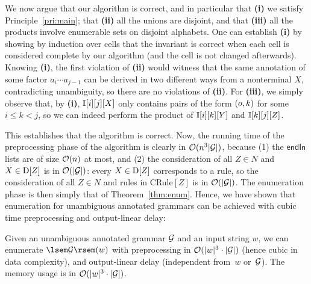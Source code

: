We now argue that our algorithm is correct, and in particular
that 
\textbf{(i)} 
%
we satisfy Principle~\ref{pri:main};
that
\textbf{(ii)} all the unions are disjoint, and that \textbf{(iii)} all the
products involve enumerable sets on disjoint alphabets. 
One can establish \textbf{(i)} by showing by induction over cells that the invariant is
correct when each cell is considered complete by our algorithm (and the
cell is not changed afterwards). Knowing \textbf{(i)}, the first violation of \textbf{(ii)} would witness that
the same annotation of some factor $a_i \cdots a_{j-1}$ can be derived in two
different ways from a nonterminal $X$,
contradicting unambiguity, so there are no
violations of \textbf{(ii)}. For
\textbf{(iii)}, we simply observe that, by \textbf{(i)}, $\mathbb{I}[i][j][X]$
only contains pairs of the form $(\oout, k)$ for some $i \leq k < j$, so we can
indeed perform the product of $\mathbb{I}[i][k][Y]$ and $\mathbb{I}[k][j][Z]$.

This establishes that the algorithm is correct. Now, the running time
of the preprocessing phase of the algorithm is clearly in $\mathcal{O}(n^3 |\mathcal{G}|)$, because (1) the $\mathsf{endIn}$ lists
are of size $\mathcal{O}(n)$ at most, and (2) the consideration of all $Z \in N$ and $X \in \mathrm{D}[Z]$
is in $\mathcal{O}(|\mathcal{G}|)$: every $X \in \mathrm{D}[Z]$ corresponds to a rule, so the consideration of all $Z \in N$ and
rules in CRule$[Z]$ is in $\mathcal{O}(|\mathcal{G}|)$.
%
The enumeration phase is then simply that of Theorem~\ref{thm:enum}. Hence, we have
shown that enumeration for unambiguous annotated grammars can be achieved
with cubic time preprocessing and output-linear delay:

\begin{theorem}
  \label{thm:cubic}
	Given an unambiguous annotated grammar $\mathcal{G}$ and an input string
        $w$, we can enumerate $\sem{\cG}(w)$ with preprocessing in $\mathcal{O}(|w|^3
        \cdot
        |\mathcal{G}|)$ (hence cubic in data complexity), and output-linear delay
        (independent from~$w$ or~$\mathcal{G}$). The memory usage is in $\mathcal{O}(|w|^3 \cdot
        |\mathcal{G}|)$.
\end{theorem}	



\newcommand{\To}{\textbf{to}}
\newcommand{\Downto}{\textbf{downto}}

